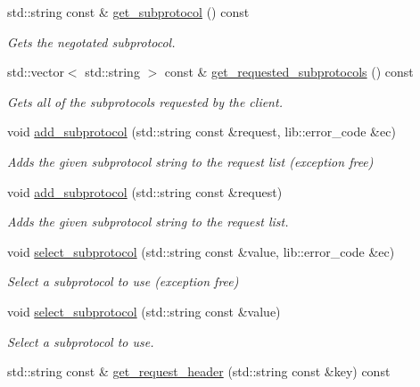 \begin{DoxyCompactItemize}
std\+::string const  \& \hyperlink{classwebsocketpp_1_1connection_ae8577184f6e4d82955cc38e1a9f8164b}{get\+\_\+subprotocol} () const
\begin{DoxyCompactList}\small\item\em Gets the negotated subprotocol. \end{DoxyCompactList}\item 
std\+::vector$<$ std\+::string $>$ const  \& \hyperlink{classwebsocketpp_1_1connection_ae0f196cb11d4a38ef59f2173424a4d51}{get\+\_\+requested\+\_\+subprotocols} () const
\begin{DoxyCompactList}\small\item\em Gets all of the subprotocols requested by the client. \end{DoxyCompactList}\item 
void \hyperlink{classwebsocketpp_1_1connection_a36462b406f973e16d3107e786c6b9172}{add\+\_\+subprotocol} (std\+::string const \&request, lib\+::error\+\_\+code \&ec)
\begin{DoxyCompactList}\small\item\em Adds the given subprotocol string to the request list (exception free) \end{DoxyCompactList}\item 
void \hyperlink{classwebsocketpp_1_1connection_a37a41672dd87714eb045fd989f98cd26}{add\+\_\+subprotocol} (std\+::string const \&request)
\begin{DoxyCompactList}\small\item\em Adds the given subprotocol string to the request list. \end{DoxyCompactList}\item 
void \hyperlink{classwebsocketpp_1_1connection_a53e9587a711e543ed353e8ecec13d44c}{select\+\_\+subprotocol} (std\+::string const \&value, lib\+::error\+\_\+code \&ec)
\begin{DoxyCompactList}\small\item\em Select a subprotocol to use (exception free) \end{DoxyCompactList}\item 
void \hyperlink{classwebsocketpp_1_1connection_a96b37fbab88dfb78b1641c0c30710243}{select\+\_\+subprotocol} (std\+::string const \&value)
\begin{DoxyCompactList}\small\item\em Select a subprotocol to use. \end{DoxyCompactList}\item 
std\+::string const  \& \hyperlink{classwebsocketpp_1_1connection_a542dd013907c3aeb2dbb01d1d631a492}{get\+\_\+request\+\_\+header} (std\+::string const \&key) const

\end{DoxyCompactItemize}
